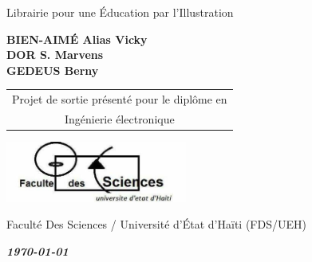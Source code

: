 \thispagestyle{empty}
\begin{titlepage}
    \begin{center}
        \vspace*{1cm}

        \Huge
        {\bfseries\scshape \projectName}

        \vspace{0.5cm}
        \LARGE
        Librairie pour une \'Education par l'Illustration

        \vspace{1.5cm}

        \large
        \textbf{BIEN-AIM\'E Alias Vicky\\ DOR S. Marvens\\ GEDEUS Berny}

        \vfill
        \begin{tabular}{c}
        \hline
         Projet de sortie pr\'esent\'e pour le dipl\^ome en\\
        Ing\'enierie \'electronique\\
        \hline
        \end{tabular}


        \vfill

        \includegraphics[height=2cm]{Pictures/LogoFDS.jpeg}

        \vspace{0.4cm}
        Facult\'e Des Sciences / Universit\'e d'\'Etat d'Ha\"iti (FDS/UEH)\\
        \vspace{0.8cm}

        \normalsize
        \emph{\bfseries \today}
        \vspace{0.5cm}

    \end{center}
\end{titlepage}

